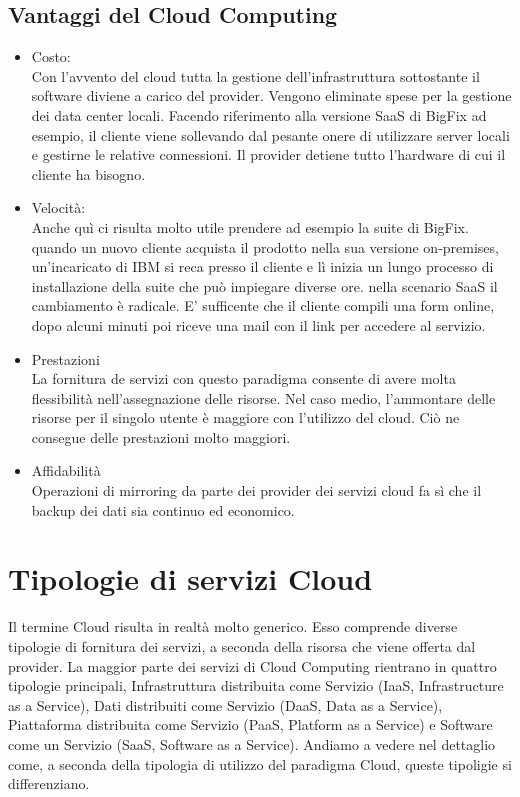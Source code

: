 \subsection{Vantaggi del Cloud Computing}
\begin{itemize}
	\item Costo: \\
	Con l'avvento del cloud tutta la gestione dell'infrastruttura sottostante il software diviene a carico del provider. Vengono eliminate spese per la gestione dei data center locali. Facendo riferimento alla versione SaaS di BigFix ad esempio, il cliente viene sollevando dal pesante onere di utilizzare server locali e gestirne le relative connessioni. Il provider detiene tutto l'hardware di cui il cliente ha bisogno.
	
	\item Velocità: \\
	Anche quì ci risulta molto utile prendere ad esempio la suite di BigFix. quando un nuovo cliente acquista il prodotto nella sua versione on-premises, un'incaricato di IBM si reca presso il cliente e lì inizia un lungo processo di installazione della suite che può impiegare diverse ore. nella scenario SaaS il cambiamento è radicale. E' sufficente che il cliente compili una form online, dopo alcuni minuti poi riceve una mail con il link per accedere al servizio.
	
	\item Prestazioni \\
	La fornitura de servizi con questo paradigma consente di avere molta flessibilità nell'assegnazione delle risorse. Nel caso medio, l'ammontare delle risorse per il singolo utente è maggiore con l'utilizzo del cloud. Ciò ne consegue delle prestazioni molto maggiori.
	
	\item Affidabilità \\
	Operazioni di mirroring da parte dei provider dei servizi cloud fa sì che il backup dei dati sia continuo ed economico.
\end{itemize}

\section{Tipologie di servizi Cloud}
Il termine Cloud risulta in realtà molto generico. Esso comprende diverse tipologie di fornitura dei servizi, a seconda della risorsa che viene offerta dal provider. La maggior parte dei servizi di Cloud Computing rientrano in quattro tipologie principali, Infrastruttura distribuita come Servizio (IaaS, Infrastructure as a Service), Dati distribuiti come Servizio (DaaS, Data as a Service), Piattaforma distribuita come Servizio (PaaS, Platform as a Service) e Software come un Servizio (SaaS, Software as a Service). Andiamo a vedere nel dettaglio come, a seconda della tipologia di utilizzo del paradigma Cloud, queste tipoligie si differenziano.
